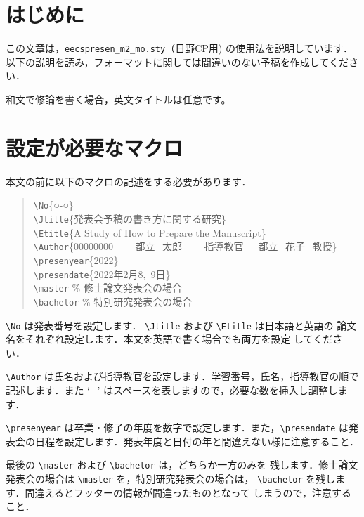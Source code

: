 \documentclass[a4paper]{ltjsarticle}
\begin{document}
\mktitle
%
\renewcommand{\baselinestretch}{1.1}\small
%
\section{はじめに}
この文章は，{\tt eecspresen\_m2\_mo.sty}（日野CP用) の使用法を説明しています．
以下の説明を読み，フォーマットに関しては間違いのない予稿を作成してください．

和文で修論を書く場合，英文タイトルは任意です。

\section{設定が必要なマクロ}

本文の前に以下のマクロの記述をする必要があります．
\newcommand{\tbs}{\textbackslash}
\newcommand{\macrocom}[1]{{\tt \textbackslash#1}}

\begin{quote}
\macrocom{No}\{○-○\}\\
\macrocom{Jtitle}\{発表会予稿の書き方に関する研究\}\\
\macrocom{Etitle}\{A Study of How to Prepare the Manuscript\}\\
\macrocom{Author}\{00000000\_\_\_都立\_太郎\_\_\_指導教官\_\_都立\_花子\_教授\}\\
\macrocom{presenyear}\{2022\}\\
\macrocom{presendate}\{2022年2月8,~9日\}\\%
\macrocom{master}   \% 修士論文発表会の場合\\
\macrocom{bachelor} \% 特別研究発表会の場合
\end{quote}

\macrocom{No} は発表番号を設定します．
\macrocom{Jtitle} および \macrocom{Etitle} は日本語と英語の
論文名をそれぞれ設定します．本文を英語で書く場合でも両方を設定
してください．

\macrocom{Author} は氏名および指導教官を設定します．学習番号，氏名，指導教官の順で
記述します．また `\_' はスペースを表しますので，必要な数を挿入し調整します．

\macrocom{presenyear} は卒業・修了の年度を数字で設定します．また，\macrocom{presendate} 
は発表会の日程を設定します．発表年度と日付の年と間違えない様に注意すること．

最後の \macrocom{master} および \macrocom{bachelor} は，どちらか一方のみを
残します．修士論文発表会の場合は \macrocom{master} を，特別研究発表会の場合は，
\macrocom{bachelor} を残します．間違えるとフッターの情報が間違ったものとなって
しまうので，注意すること．
\end{document}
